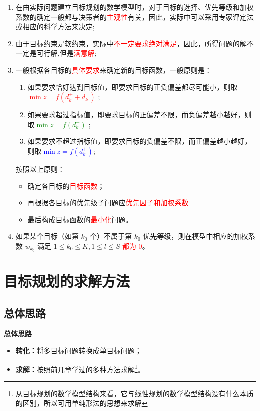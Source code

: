     \begin{enumerate}
        \item 在由实际问题建立目标规划的数学模型时，对于目标的选择、优先等级和加权系数的确定一般都与决策者的\textcolor{red}{主观性}有关，因此，实际中可以采用专家评定法或相应的科学方法来决定;
        \item 由于目标约束是软约束，实际中\textcolor{red}{不一定要求绝对满足}，因此，所得问题的解不一定是可行解,但是\textcolor{red}{满意解};
        \item 一般根据各目标的\textcolor{red}{具体要求}来确定新的目标函数，一般原则是：
        \begin{enumerate}
            \item 如果要求恰好达到目标值，即要求目标的正负偏差都尽可能小，则取\textcolor{red}{ $\min z=f (d_{k}^{+}+d_{k}^{-})$ };
            \item 如果要求超过指标值，即要求目标的正偏差不限，而负偏差越小越好，则取\textcolor{green}{$\min z=f (d_{k}^{-})$} ;
            \item 如果要求不超过指标值，即要求目标的负偏差不限，而正偏差越小越好，则取\textcolor{blue} {$\min z=f (d_{k}^{+})$};
        \end{enumerate}
        按照以上原则：
        \begin{itemize}
            \item 确定各目标的\textcolor{red}{目标函数}；
            \item 再根据各目标的优先级子问题应\textcolor{red}{优先因子和加权系数}
            \item 最后构成目标函数的\textcolor{red}{最小化}问题。
        \end{itemize}
        \item 如果某个目标（如第 $k_0$ 个）不属于第 $k_0$ 优先等级，则在模型中相应的加权系数 $w_{k_0}$ 满足 $1 \le k_0 \le K, 1 \le l \le S$ \textcolor{red}{都为 0}。
    \end{enumerate}

    \section{目标规划的求解方法}
    \subsection{总体思路}
    \begin{notebox}{\textbf{总体思路}}{}
    \begin{itemize}
    \item \textbf{转化：}将多目标问题转换成单目标问题；
    \item \textbf{求解：}按照前几章学过的多种方法求解\footnote{从目标规划的数学模型结构来看，它与线性规划的数学模型结构没有什么本质的区別，所以可用单纯形法的思想来求解}。
    \end{itemize}
    \end{notebox}

